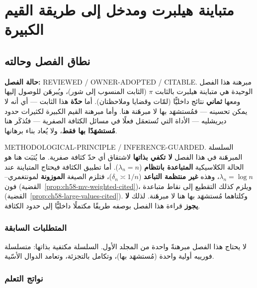 \chapter{متباينة هيلبرت ومدخل إلى طريقة القيم الكبيرة}

\section{نطاق الفصل وحالته}

\noindent\textbf{حالة الفصل:} \textenglish{REVIEWED / OWNER-ADOPTED / CITABLE}.
مبرهنة هذا الفصل الوحيدة هي متباينة هيلبرت بالثابت \(\pi\) (الثابت
المنسوب إلى شور)، ويُبرهَن للوصول إليها ومعها \textbf{ثماني} نتائج
داخليًّا (لمّات وقضايا وملاحظتان). أما \textbf{حدّة} هذا الثابت — أي أنه
لا يمكن تحسينه — فمُستشهَد بها لا مبرهَنة هنا. وأما مبرهنة القيم الكبيرة لكثيرات
حدود ديريشليه — الأداة التي تُستعمَل فعلًا في مسائل الكثافة الصفرية —
فتُذكَر هنا \textbf{مُستشهَدًا بها فقط}، ولا يُعاد بناء برهانها.

\begin{remark}
\label{rem:ch58-scope-warning}
\noindent\textenglish{METHODOLOGICAL-PRINCIPLE / INFERENCE-GUARDED}.
السلسلة المبرهَنة في هذا الفصل \textbf{لا تكفي بذاتها} لاشتقاق أي حدّ
كثافة صفرية. ما يُثبَت هنا هو الحالة الكلاسيكية \textbf{المتباعدة
بانتظام} (\(\lambda_n=n\)). أما تطبيق الكثافة فيحتاج المتباينة عند
\(\lambda_n=\log n\)، وهذه \textbf{غير منتظمة التباعد}
(\(\delta_n\asymp1/n\))، فتلزم الصيغة \textbf{الموزونة} لمونتغمري–فون
(القضية~\ref{prop:ch58-mv-weighted-cited})، ويلزم كذلك التقطيع إلى نقاط
متباعدة (القضية~\ref{prop:ch58-large-values-cited}). وكلتاهما مُستشهَد
بها هنا لا مبرهَنة. لذلك \textbf{لا يجوز} قراءة هذا الفصل بوصفه طريقًا
مكتملًا داخليًّا إلى حدود الكثافة.
\end{remark}

\subsection{المتطلبات السابقة}

لا يحتاج هذا الفصل مبرهنةً واحدة من المجلد الأول. السلسلة مكتفية بذاتها:
متسلسلة فورييه أولية واحدة (مُستشهَد بها)، وتكامل بالتجزئة، وتعامد
الدوال الأسّية.

\subsection{نواتج التعلم}

